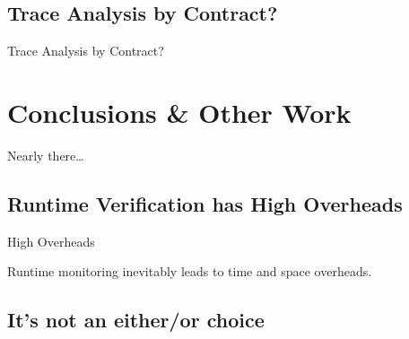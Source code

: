 \documentclass[12pt]{beamer}
\begin{document}
\subsection{Trace Analysis by Contract?}
\label{sec:runver-tbc}

\begin{frame}{Trace Analysis by Contract?}
\end{frame}


\section{Conclusions \& Other Work}
\label{sec:conc}

\begin{frame}
  \begin{center}
    \Large Nearly there\ldots
  \end{center}
\end{frame}

\subsection{Runtime Verification has High Overheads}
\label{sec:conc-over}

\begin{frame}{High Overheads}

  Runtime monitoring inevitably leads to time and space overheads.

\end{frame}

\subsection{It's not an either/or choice}
\label{sec:conc-dich}
\end{document}

